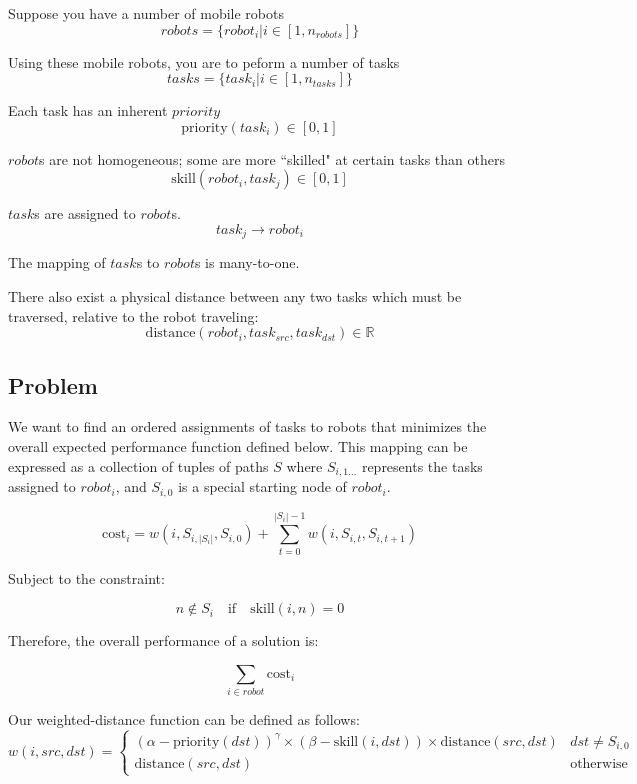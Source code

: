 \documentclass[a4paper]{article}
\begin{document}
Suppose you have a number of mobile robots
$$\mathit{robots} = \{ \mathit{robot}_i | i \in [1, n_\mathit{robots}] \}$$

Using these mobile robots, you are to peform a number of tasks
$$\mathit{tasks} = \{ \mathit{task}_i | i \in [1, n_\mathit{tasks}] \}$$

Each task has an inherent $\mathit{priority}$
$$\text{priority}(\mathit{task}_i) \in [0 ,1]$$

$\mathit{robot}$s are not homogeneous; some are more ``skilled" at certain tasks than others
$$\text{skill}(\mathit{robot}_i, \mathit{task}_j) \in [0 ,1]$$

$\mathit{task}$s are assigned to $\mathit{robot}$s.
$$\mathit{task}_j \rightarrow \mathit{robot}_i$$

The mapping of $task$s to $robot$s is many-to-one.

There also exist a physical distance between any two tasks which must be traversed, relative to the robot traveling:
$$
\text{distance}(\mathit{robot}_i, \mathit{task}_{src}, \mathit{task}_{dst}) \in \mathbb{R}
$$

\subsection{Problem}

We want to find an ordered assignments of tasks to robots that minimizes the overall expected performance function defined below. This mapping can be expressed as a collection of tuples of paths $S$ where $S_{i,1\dots}$ represents the tasks assigned to $\mathit{robot}_i$, and $S_{i,0}$ is a special starting node of $\mathit{robot}_i$.

$$
\text{cost}_i = w(i, S_{i,|S_i|}, S_{i,0}) + \sum_{t = 0}^{|S_i|-1} w(i, S_{i,t}, S_{i,t+1})
$$

Subject to the constraint:

$$
n \notin S_i \quad \text{if} \quad \text{skill}(i, n) = 0
$$

Therefore, the overall performance of a solution is: 

$$
\sum_{i \in \mathit{robot}} \text{cost}_i
$$

Our weighted-distance function can be defined as follows:
$$
w(i, \mathit{src}, \mathit{dst}) = \begin{cases}
(\alpha - \text{priority}(\mathit{dst}))^\gamma \times (\beta - \text{skill}(i, \mathit{dst})) \times \text{distance}(\mathit{src}, \mathit{dst}) & \mathit{dst} \ne S_{i,0} \\
\text{distance}(\mathit{src}, \mathit{dst}) & \text{otherwise}
\end{cases}
$$
\end{document}
